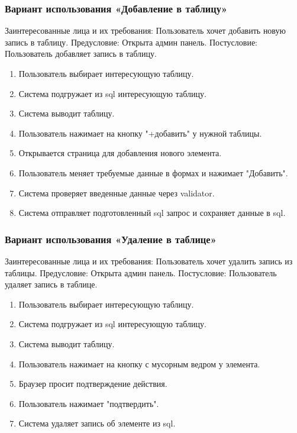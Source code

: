 \subsubsection{Вариант использования «Добавление в таблицу»}
Заинтересованные лица и их требования: Пользователь хочет добавить новую запись в таблицу.
Предусловие: Открыта админ панель.
Постусловие: Пользователь добавляет запись в таблицу.
\begin{enumerate}
	\item Пользователь выбирает интересующую таблицу.
	\item Система подгружает из sql интересующую таблицу.
	\item Система выводит таблицу.
	\item Пользователь нажимает на кнопку "+добавить" у нужной таблицы.
	\item Открывается страница для добавления нового элемента.
	\item Пользователь меняет требуемые данные в формах и нажимает "Добавить".
	\item Система проверяет введенные данные через validator.
	\item Система отправляет подготовленный sql запрос и сохраняет данные в sql.
\end{enumerate}

\subsubsection{Вариант использования «Удаление в таблице»}
Заинтересованные лица и их требования: Пользователь хочет удалить запись из таблицы.
Предусловие: Открыта админ панель.
Постусловие: Пользователь удаляет запись в таблице.
\begin{enumerate}
	\item Пользователь выбирает интересующую таблицу.
	\item Система подгружает из sql интересующую таблицу.
	\item Система выводит таблицу.
	\item Пользователь нажимает на кнопку с мусорным ведром у элемента.
	\item Браузер просит подтверждение действия.
	\item Пользователь нажимает "подтвердить".
	\item Система удаляет запись об элементе из sql.
\end{enumerate}

